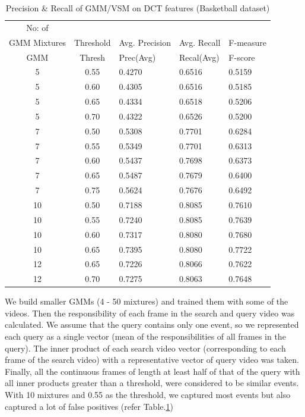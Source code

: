 \begin{table}[ht]
\caption[Event spotting using GMM/VSM on DCT features (Basketball Dataset) ]{ Precision \& Recall  of GMM/VSM on DCT features (Basketball dataset)}
\label{table:dct_gmm_res_basket}
\centering
\begin{tabular}{|c|c|l|l|l|}
\hline
No: of &&&&\\
GMM Mixtures & Threshold & Avg. Precision & Avg. Recall & F-measure\\
\hline
\hline
GMM	 & Thresh	 & Prec(Avg)	 & Recal(Avg)	 & F-score \\
 5	 & 0.55	 & 0.4270	 & 0.6516	 & 0.5159 \\
 5	 & 0.60	 & 0.4305	 & 0.6516	 & 0.5185 \\
 5	 & 0.65	 & 0.4334	 & 0.6518	 & 0.5206 \\
 5	 & 0.70	 & 0.4322	 & 0.6526	 & 0.5200 \\
 7	 & 0.50	 & 0.5308	 & 0.7701	 & 0.6284 \\
 7	 & 0.55	 & 0.5349	 & 0.7701	 & 0.6313 \\
 7	 & 0.60	 & 0.5437	 & 0.7698	 & 0.6373 \\
 7	 & 0.65	 & 0.5487	 & 0.7679	 & 0.6400 \\
 7	 & 0.75	 & 0.5624	 & 0.7676	 & 0.6492 \\
10	 & 0.50	 & 0.7188	 & 0.8085	 & 0.7610 \\
10	 & 0.55	 & 0.7240	 & 0.8085	 & 0.7639 \\
10	 & 0.60	 & 0.7317	 & 0.8080	 & 0.7680 \\
10	 & 0.65	 & 0.7395	 & 0.8080	 & 0.7722 \\
12	 & 0.65	 & 0.7226	 & 0.8066	 & 0.7622 \\
12	 & 0.70	 & 0.7275	 & 0.8063	 & 0.7648 \\
\hline  
\end{tabular}
\end{table}

We build smaller GMMs (4 - 50 mixtures) and trained them with some of the videos.  Then the responsibility of each frame in the search and query video was calculated.  We assume that the query contains only one event, so we represented each query as a single vector (mean of the responsibilities of all frames in the query).  The inner product of each search video vector (corresponding to each frame of the search video) with a representative vector of query video was taken.  Finally, all the continuous frames of length at least half of that of the query with all inner products greater than a threshold, were considered to be similar events.  With 10 mixtures and 0.55 as the threshold, we captured most events but also captured a lot of false positives (refer Table.\ref{table:dct_gmm_res_basket})


